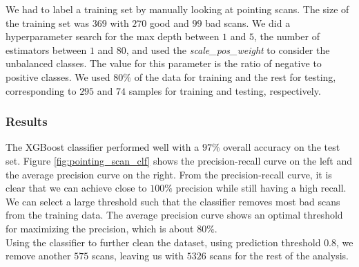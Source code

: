 We had to label a training set by manually looking at pointing scans.
The size of the training set was $369$ with $270$ good and $99$ bad scans.
We did a hyperparameter search for the max depth between $1$ and $5$, the number of estimators between $1$ and $80$, 
and used the \textit{scale\_pos\_weight} to consider the unbalanced classes.
The value for this parameter is the ratio of negative to positive classes. We used
$80\%$ of the data for training and the rest for testing, corresponding to $295$ and $74$ samples for training and testing, respectively.


\subsubsection{Results}
The XGBoost classifier performed well with a $97\%$ overall accuracy on the test set.
Figure \ref{fig:pointing_scan_clf} shows the precision-recall curve on the left and the average precision curve on the right.
From the precision-recall curve, it is clear that we can achieve close to $100\%$ precision while still having a high recall.
We can select a large threshold such that the classifier removes most bad scans from the training data.
The average precision curve shows an optimal threshold for maximizing the precision, which is about $80\%$.\\

Using the classifier to further clean the dataset, using prediction threshold $0.8$, we remove another $575$ scans, leaving us with
$5326$ scans for the rest of the analysis.


